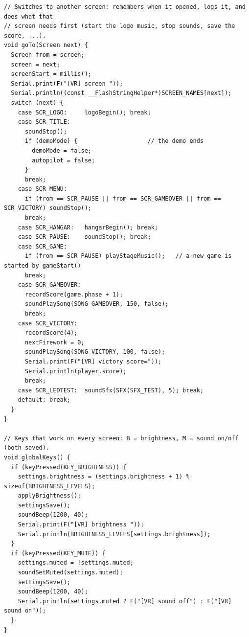 \documentclass[11pt,a4paper]{article}
\begin{document}
\begin{latin}
\begin{lstlisting}[language=Arduino]
// Switches to another screen: remembers when it opened, logs it, and does what that
// screen needs first (start the logo music, stop sounds, save the score, ...).
void goTo(Screen next) {
  Screen from = screen;
  screen = next;
  screenStart = millis();
  Serial.print(F("[VR] screen "));
  Serial.println((const __FlashStringHelper*)SCREEN_NAMES[next]);
  switch (next) {
    case SCR_LOGO:     logoBegin(); break;
    case SCR_TITLE:
      soundStop();
      if (demoMode) {                    // the demo ends
        demoMode = false;
        autopilot = false;
      }
      break;
    case SCR_MENU:
      if (from == SCR_PAUSE || from == SCR_GAMEOVER || from == SCR_VICTORY) soundStop();
      break;
    case SCR_HANGAR:   hangarBegin(); break;
    case SCR_PAUSE:    soundStop(); break;
    case SCR_GAME:
      if (from == SCR_PAUSE) playStageMusic();   // a new game is started by gameStart()
      break;
    case SCR_GAMEOVER:
      recordScore(game.phase + 1);
      soundPlaySong(SONG_GAMEOVER, 150, false);
      break;
    case SCR_VICTORY:
      recordScore(4);
      nextFirework = 0;
      soundPlaySong(SONG_VICTORY, 100, false);
      Serial.print(F("[VR] victory score="));
      Serial.println(player.score);
      break;
    case SCR_LEDTEST:  soundSfx(SFX(SFX_TEST), 5); break;
    default: break;
  }
}

// Keys that work on every screen: B = brightness, M = sound on/off (both saved).
void globalKeys() {
  if (keyPressed(KEY_BRIGHTNESS)) {
    settings.brightness = (settings.brightness + 1) % sizeof(BRIGHTNESS_LEVELS);
    applyBrightness();
    settingsSave();
    soundBeep(1200, 40);
    Serial.print(F("[VR] brightness "));
    Serial.println(BRIGHTNESS_LEVELS[settings.brightness]);
  }
  if (keyPressed(KEY_MUTE)) {
    settings.muted = !settings.muted;
    soundSetMuted(settings.muted);
    settingsSave();
    soundBeep(1200, 40);
    Serial.println(settings.muted ? F("[VR] sound off") : F("[VR] sound on"));
  }
}


\end{lstlisting}
\end{latin}
\end{document}
